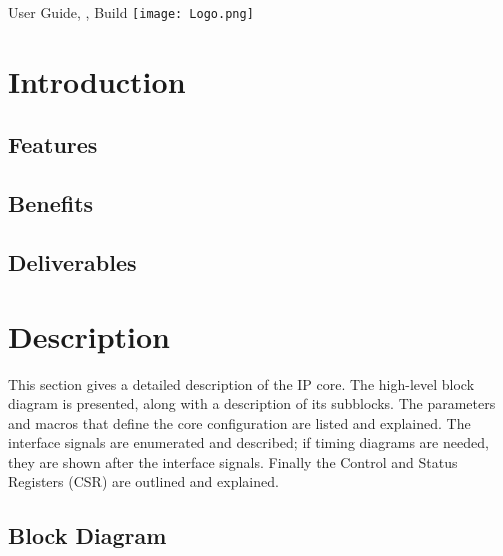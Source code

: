 \documentclass{ug}
\date{\today}
\begin{document}
\maketitle
{}

\vspace*{\fill}
User Guide, , Build 
\hspace*{\fill} \texttt{[image: Logo.png]}

\cleardoublepage
{}
\setcounter{page}{1}

\cleardoublepage
\tableofcontents
\clearpage
\listoftables
\clearpage
\listoffigures
\cleardoublepage
{}
\setcounter{page}{1}
\section{Introduction}
\label{sec:intro}



\subsection{Features}
\label{sec:feat}


\subsection{Benefits}
\label{sec:benef}


\subsection{Deliverables}
\label{sec:deliv}


\ifdefined\SECTIONCLEARPAGE
\clearpage
\fi
\section{Description}

This section gives a detailed description of the IP core. The high-level block
diagram is presented, along with a description of its subblocks. The parameters and
macros that define the core configuration are listed and explained. The
interface signals are enumerated and described; if timing diagrams are needed,
they are shown after the interface signals. Finally the Control and Status
Registers (CSR) are outlined and explained.

\subsection{Block Diagram}
\label{sec:bdd}

\end{document}

